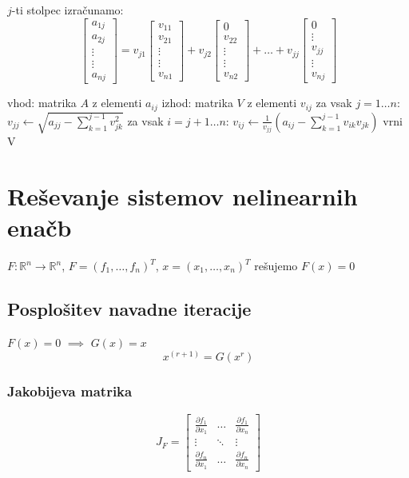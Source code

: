 \begin{multicols}{4}
$j$-ti stolpec izračunamo:
\[
	\begin{bmatrix}
		a_{1j} \\ a_{2j} \\ \vdots \\ \vdots \\ a_{nj}
	\end{bmatrix}
	=
	v_{j1} \begin{bmatrix}
		v_{11} \\ v_{21} \\ \vdots \\ \vdots \\ v_{n1}
	\end{bmatrix}
	+
	v_{j2} \begin{bmatrix}
		0 \\ v_{22} \\ \vdots \\ \vdots \\ v_{n2}
	\end{bmatrix}
	+ \dots +
	v_{jj} \begin{bmatrix}
		0 \\ \vdots \\ v_{jj} \\ \vdots \\ v_{nj}
	\end{bmatrix}
\]

\begin{koda}
vhod: matrika $A$ z elementi $a_{ij}$
izhod: matrika $V$ z elementi $v_{ij}$
za vsak $j = 1 \dots n$:
	$v_{jj} \leftarrow \sqrt{a_{jj}-\sum\limits_{k=1}^{j-1} v_{jk}^2}$
	za vsak $i = j+1 \dots n$:
		$v_{ij} \leftarrow \frac{1}{v_{jj}} \left( a_{ij} - \sum\limits_{k=1}^{j-1} v_{ik} v_{jk} \right)$
vrni V
\end{koda}

\section{Reševanje sistemov nelinearnih enačb}
$F: \mathbb{R}^n \to \mathbb{R}^n$, $F = (f_1, \dots, f_n)^T$, $x = (x_1, \dots, x_n)^T$ rešujemo $F(x) = 0$

\subsection{Posplošitev navadne iteracije}
$F(x) = 0$ $\implies$ $G(x) = x$
\[ x^{(r+1)} = G(x^{r})\]

\subsubsection{Jakobijeva matrika}
\[
	J_F = \begin{bmatrix}
		\frac{\partial f_1}{\partial x_1} & \dots & \frac{\partial f_1}{\partial x_n} \\
		\vdots & \ddots & \vdots \\
		\frac{\partial f_n}{\partial x_1} & \dots & \frac{\partial f_n}{\partial x_n}
	\end{bmatrix}
\]


\end{multicols}
